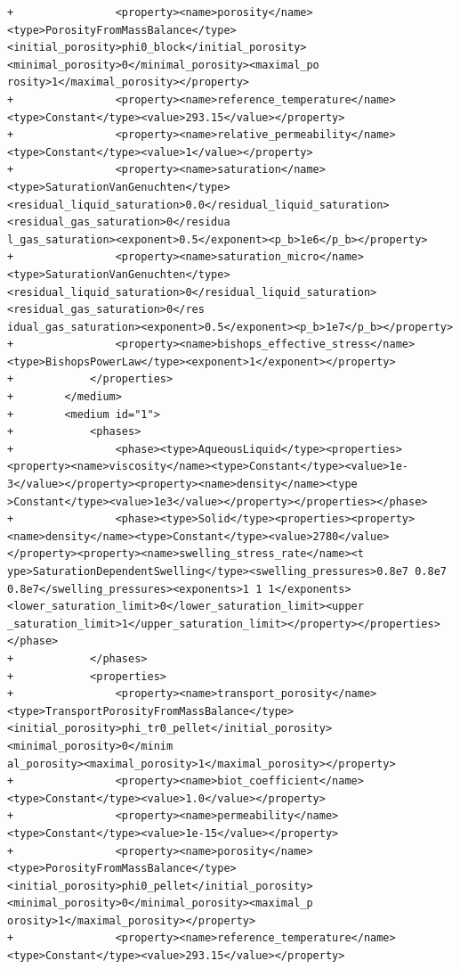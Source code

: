 \documentclass[10pt]{article}
\begin{document}
\begin{lstlisting}
+                <property><name>porosity</name><type>PorosityFromMassBalance</type><initial_porosity>phi0_block</initial_porosity><minimal_porosity>0</minimal_porosity><maximal_po
rosity>1</maximal_porosity></property>
+                <property><name>reference_temperature</name><type>Constant</type><value>293.15</value></property>
+                <property><name>relative_permeability</name><type>Constant</type><value>1</value></property>
+                <property><name>saturation</name><type>SaturationVanGenuchten</type><residual_liquid_saturation>0.0</residual_liquid_saturation><residual_gas_saturation>0</residua
l_gas_saturation><exponent>0.5</exponent><p_b>1e6</p_b></property>
+                <property><name>saturation_micro</name><type>SaturationVanGenuchten</type><residual_liquid_saturation>0</residual_liquid_saturation><residual_gas_saturation>0</res
idual_gas_saturation><exponent>0.5</exponent><p_b>1e7</p_b></property>
+                <property><name>bishops_effective_stress</name><type>BishopsPowerLaw</type><exponent>1</exponent></property>
+            </properties>
+        </medium>
+        <medium id="1">
+            <phases>
+                <phase><type>AqueousLiquid</type><properties><property><name>viscosity</name><type>Constant</type><value>1e-3</value></property><property><name>density</name><type
>Constant</type><value>1e3</value></property></properties></phase>
+                <phase><type>Solid</type><properties><property><name>density</name><type>Constant</type><value>2780</value></property><property><name>swelling_stress_rate</name><t
ype>SaturationDependentSwelling</type><swelling_pressures>0.8e7 0.8e7 0.8e7</swelling_pressures><exponents>1 1 1</exponents><lower_saturation_limit>0</lower_saturation_limit><upper
_saturation_limit>1</upper_saturation_limit></property></properties></phase>
+            </phases>
+            <properties>
+                <property><name>transport_porosity</name><type>TransportPorosityFromMassBalance</type><initial_porosity>phi_tr0_pellet</initial_porosity><minimal_porosity>0</minim
al_porosity><maximal_porosity>1</maximal_porosity></property>
+                <property><name>biot_coefficient</name><type>Constant</type><value>1.0</value></property>
+                <property><name>permeability</name><type>Constant</type><value>1e-15</value></property>
+                <property><name>porosity</name><type>PorosityFromMassBalance</type><initial_porosity>phi0_pellet</initial_porosity><minimal_porosity>0</minimal_porosity><maximal_p
orosity>1</maximal_porosity></property>
+                <property><name>reference_temperature</name><type>Constant</type><value>293.15</value></property>

\end{lstlisting}
\end{document}
